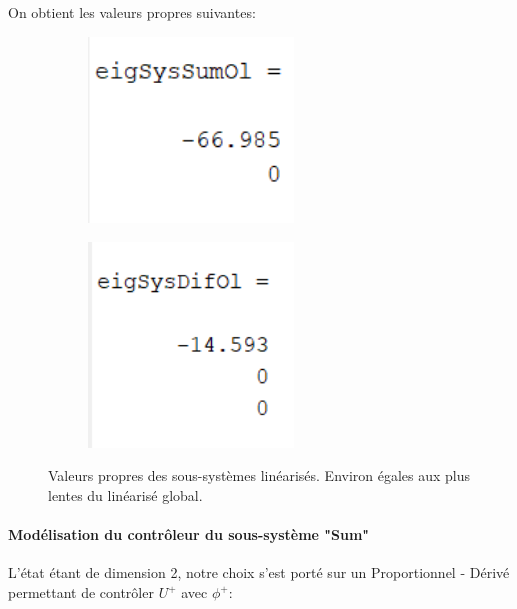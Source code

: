 \documentclass{report}
\begin{document}
On obtient les valeurs propres suivantes:

\begin{figure}[h]  %
    \begin{subfigure}{.5\textwidth}
        \centering
        \includegraphics[width=0.6\textwidth]{figures/eigSysSumOl.png}        
      \end{subfigure}    
      \begin{subfigure}{.5\textwidth}
        \centering
        \includegraphics[width=0.6\textwidth]{figures/eigSysDifOl.png}
      \end{subfigure}    
      \caption{Valeurs propres des sous-systèmes linéarisés. 
      Environ égales aux plus lentes du linéarisé global.}
\end{figure}

\paragraph{Modélisation du contrôleur du sous-système "Sum"}

L'état étant de dimension 2, notre choix s'est porté sur un Proportionnel
- Dérivé permettant de contrôler $U^+$ avec $\phi^+$:
\end{document}

